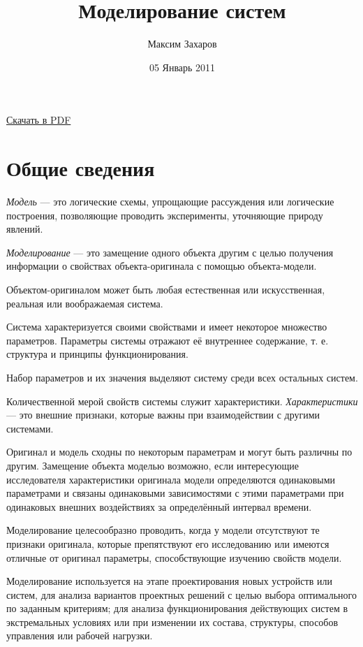 \documentclass[12pt, russian, oneside, article]{ncc}
\begin{document}
\title{Моделирование систем}
\author{Максим Захаров}
\date{05 Январь 2011}
\maketitle

\setcounter{tocdepth}{3}
\tableofcontents
\vspace*{1cm}

\href{file:///home/maxim/Documents/Git/zamal.github.com/pdf/MS_Lectures.pdf}{Скачать в PDF}

\section{Общие сведения}
\label{sec-1}


\emph{Модель} --- это логические схемы, упрощающие рассуждения или логические построения, позволяющие проводить эксперименты, уточняющие природу явлений.

\emph{Моделирование} --- это замещение одного объекта другим с целью получения информации о свойствах объекта-оригинала с помощью объекта-модели.

Объектом-оригиналом может быть любая естественная или искусственная, реальная или воображаемая система.

Система характеризуется своими свойствами и имеет некоторое множество параметров. Параметры системы отражают её внутреннее содержание, т. е. структура и принципы функционирования.

Набор параметров и их значения выделяют систему среди всех остальных систем.

Количественной мерой свойств системы служит характеристики. \emph{Характеристики} --- это внешние признаки, которые важны при взаимодействии с другими системами.

Оригинал и модель сходны по некоторым параметрам и могут быть различны по другим. Замещение объекта моделью возможно, если интересующие исследователя характеристики оригинала модели определяются одинаковыми параметрами и связаны одинаковыми зависимостями с этими параметрами при одинаковых внешних воздействиях за определённый интервал времени.

Моделирование целесообразно проводить, когда у модели отсутствуют те признаки оригинала, которые препятствуют его исследованию или имеются отличные от оригинал параметры, способствующие изучению свойств модели.

Моделирование используется на этапе проектирования новых устройств или систем, для анализа вариантов проектных решений с целью выбора оптимального по заданным критериям; для анализа функционирования действующих систем в экстремальных условиях или при изменении их состава, структуры, способов управления или рабочей нагрузки.
\end{document}
